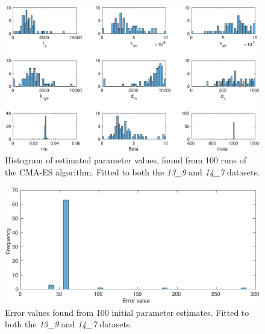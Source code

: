 \documentclass[10pt,journal]{./IEEE_latex_class/IEEEtran}
\begin{document}
\begin{figure}[H]
   \centering
        \includegraphics[scale = 0.4]{13_9_14_7_hist}
        \caption{Histogram of estimated parameter values, found from 100 runs of the CMA-ES algorithm. Fitted to both the  \textit{13\_9} and \textit{14\_7} datasets.}
        \label{}
\end{figure}

\begin{figure}[H]
   \centering
        \includegraphics[scale = 0.3]{13_9_14_7_f_hist}
        \caption{Error values found from 100 initial parameter estimates. Fitted to both the  \textit{13\_9} and \textit{14\_7} datasets.}
        \label{}
\end{figure}
\end{document}

